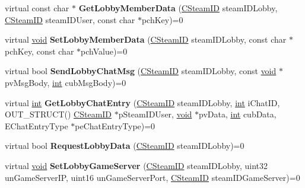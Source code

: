 \begin{DoxyCompactItemize}
\item 
\hypertarget{classISteamMatchmaking_abb257e70af749cd2f0df597bb42a524b}{}virtual const char $\ast$ {\bfseries Get\+Lobby\+Member\+Data} (\hyperlink{classCSteamID}{C\+Steam\+I\+D} steam\+I\+D\+Lobby, \hyperlink{classCSteamID}{C\+Steam\+I\+D} steam\+I\+D\+User, const char $\ast$pch\+Key)=0\label{classISteamMatchmaking_abb257e70af749cd2f0df597bb42a524b}

\item 
\hypertarget{classISteamMatchmaking_ad3c5489202c48de93c220f6ed4a33984}{}virtual \hyperlink{SDL__audio_8h_a52835ae37c4bb905b903cbaf5d04b05f}{void} {\bfseries Set\+Lobby\+Member\+Data} (\hyperlink{classCSteamID}{C\+Steam\+I\+D} steam\+I\+D\+Lobby, const char $\ast$pch\+Key, const char $\ast$pch\+Value)=0\label{classISteamMatchmaking_ad3c5489202c48de93c220f6ed4a33984}

\item 
\hypertarget{classISteamMatchmaking_a2313c8f7e00721028a06fc5b02086328}{}virtual bool {\bfseries Send\+Lobby\+Chat\+Msg} (\hyperlink{classCSteamID}{C\+Steam\+I\+D} steam\+I\+D\+Lobby, const \hyperlink{SDL__audio_8h_a52835ae37c4bb905b903cbaf5d04b05f}{void} $\ast$pv\+Msg\+Body, \hyperlink{SDL__thread_8h_a6a64f9be4433e4de6e2f2f548cf3c08e}{int} cub\+Msg\+Body)=0\label{classISteamMatchmaking_a2313c8f7e00721028a06fc5b02086328}

\item 
\hypertarget{classISteamMatchmaking_ac3b95d7676fea362221864d0b351b627}{}virtual \hyperlink{SDL__thread_8h_a6a64f9be4433e4de6e2f2f548cf3c08e}{int} {\bfseries Get\+Lobby\+Chat\+Entry} (\hyperlink{classCSteamID}{C\+Steam\+I\+D} steam\+I\+D\+Lobby, \hyperlink{SDL__thread_8h_a6a64f9be4433e4de6e2f2f548cf3c08e}{int} i\+Chat\+I\+D, O\+U\+T\+\_\+\+S\+T\+R\+U\+C\+T() \hyperlink{classCSteamID}{C\+Steam\+I\+D} $\ast$p\+Steam\+I\+D\+User, \hyperlink{SDL__audio_8h_a52835ae37c4bb905b903cbaf5d04b05f}{void} $\ast$pv\+Data, \hyperlink{SDL__thread_8h_a6a64f9be4433e4de6e2f2f548cf3c08e}{int} cub\+Data, E\+Chat\+Entry\+Type $\ast$pe\+Chat\+Entry\+Type)=0\label{classISteamMatchmaking_ac3b95d7676fea362221864d0b351b627}

\item 
\hypertarget{classISteamMatchmaking_ac2a3833252fac7c6104697d0cbf3b55a}{}virtual bool {\bfseries Request\+Lobby\+Data} (\hyperlink{classCSteamID}{C\+Steam\+I\+D} steam\+I\+D\+Lobby)=0\label{classISteamMatchmaking_ac2a3833252fac7c6104697d0cbf3b55a}

\item 
\hypertarget{classISteamMatchmaking_a661394f63eb32200983d537e3d5c0053}{}virtual \hyperlink{SDL__audio_8h_a52835ae37c4bb905b903cbaf5d04b05f}{void} {\bfseries Set\+Lobby\+Game\+Server} (\hyperlink{classCSteamID}{C\+Steam\+I\+D} steam\+I\+D\+Lobby, uint32 un\+Game\+Server\+I\+P, uint16 un\+Game\+Server\+Port, \hyperlink{classCSteamID}{C\+Steam\+I\+D} steam\+I\+D\+Game\+Server)=0\label{classISteamMatchmaking_a661394f63eb32200983d537e3d5c0053}


\end{DoxyCompactItemize}
